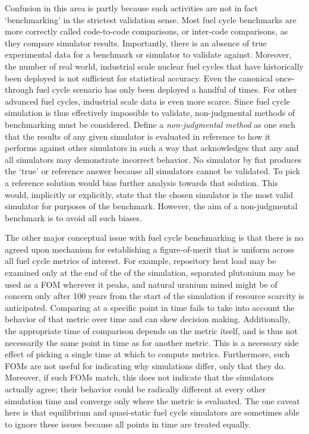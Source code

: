 \documentclass{ntmanuscript}
\begin{document}
Confusion in this area is partly because such activities
are not in fact `benchmarking' in the strictest validation sense. Most fuel
cycle benchmarks are more correctly called code-to-code comparisons, or
inter-code comparisons, as they compare simulator results. Importantly,
there is an absence of true experimental data for a benchmark or simulator
to validate against. Moreover, the number of
real world, industrial scale nuclear fuel cycles that have historically been
deployed is not sufficient for statistical accuracy. Even the canonical
once-through fuel cycle scenario has only been deployed a handful of times.
For other advanced fuel cycles, industrial scale data is even more scarce.
Since fuel cycle simulation is thus effectively impossible to validate,
non-judgmental methods of benchmarking must be considered.
Define a \emph{non-judgmental method} as one such that the
results of any given simulator is evaluated in reference to how
it performs against other simulators in such a way that acknowledges that
any and all simulators may demonstrate incorrect behavior. No simulator
by fiat produces the `true' or reference answer because all simulators
cannot be validated. To pick a reference solution would bias further analysis
towards that solution. This would, implicitly or explicitly, state that the
chosen simulator is the most valid simulator for purposes of the benchmark.
However, the aim of a non-judgmental benchmark is to avoid all such biases.

The other major conceptual issue with fuel cycle benchmarking is that there
is no agreed upon mechanism for establishing a figure-of-merit
that is uniform across all fuel cycle metrics of interest. For example,
repository heat load may be examined only at the end of the of the simulation,
separated plutonium may be used as a FOM wherever it peaks, and natural uranium
mined might be of concern only after 100 years from the start of the
simulation if resource scarcity is anticipated. Comparing at a specific point
in time fails to take into account the behavior of that metric over time and
can skew decision making. Additionally, the appropriate
time of comparison depends on the metric itself, and is thus not necessarily
the same point in time as for another metric. This is a necessary
side effect of picking a single time at which to compute metrics.
Furthermore, such FOMs are not useful for indicating why simulations differ,
only that they do. Moreover, if such FOMs match, this does not indicate
that the simulators actually agree; their behavior
could be radically different at every other simulation time and converge
only where the metric is evaluated.  The one caveat
here is that
equilibrium and quasi-static fuel cycle simulators are sometimes able to
ignore these issues because all points in time are treated equally.
\end{document}
